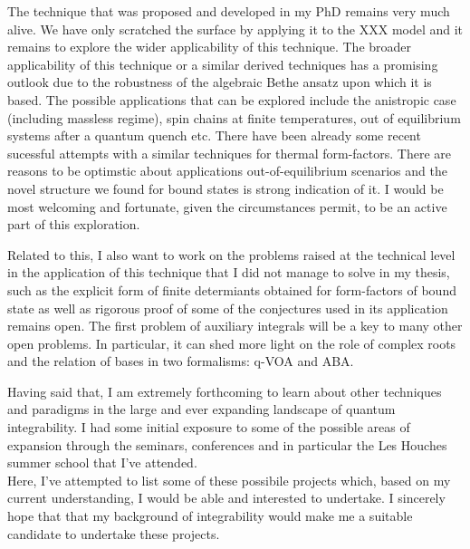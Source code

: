 \documentclass[a4paper, 11pt, DIV=15]{scrarticle}
\begin{document}
The technique that was proposed and developed in my PhD remains very much alive. We have only scratched the surface by applying it to the XXX model and it remains to explore the wider applicability of this technique.
The broader applicability of this technique or a similar derived techniques has a promising outlook due to the robustness of the algebraic Bethe ansatz upon which it is based.
The possible applications that can be explored include the anistropic case (including massless regime), spin chains at finite temperatures, out of equilibrium systems after a quantum quench etc.
There have been already some recent sucessful attempts with a similar techniques for thermal form-factors.
There are reasons to be optimstic about applications out-of-equilibrium scenarios and the novel structure we found for bound states is strong indication of it.
I would be most welcoming and fortunate, given the circumstances permit, to be an active part of this exploration.
\par
Related to this, I also want to work on the problems raised at the technical level in the application of this technique that I did not manage to solve in my thesis, such as the explicit form of finite determiants obtained for form-factors of bound state as well as rigorous proof of some of the conjectures used in its application remains open.
The first problem of auxiliary integrals will be a key to many other open problems. In particular, it can shed more light on the role of complex roots and the relation of bases in two formalisms: q-VOA and ABA.
\par
\vspace{.5em}
Having said that, I am extremely forthcoming to learn about other techniques and paradigms in the large and ever expanding landscape of quantum integrability.
I had some initial exposure to some of the possible areas of expansion through the seminars, conferences and in particular the Les Houches summer school that I've attended. 
\\
Here, I've attempted to list some of these possibile projects which, based on my current understanding, I would be able and interested to undertake.
I sincerely hope that that my background of integrability would make me a suitable candidate to undertake these projects.
\end{document}
